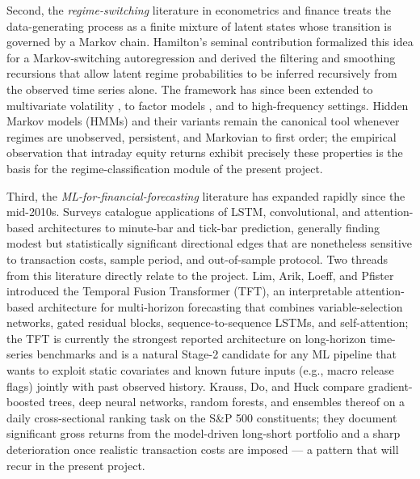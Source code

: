 \documentclass[11pt]{article}
\begin{document}
Second, the \emph{regime-switching} literature in econometrics and finance treats the data-generating process as a finite mixture of latent states whose transition is governed by a Markov chain.  Hamilton's seminal contribution \cite{hamilton1989} formalized this idea for a Markov-switching autoregression and derived the filtering and smoothing recursions that allow latent regime probabilities to be inferred recursively from the observed time series alone.  The framework has since been extended to multivariate volatility \cite{billio2010}, to factor models \cite{ang2002}, and to high-frequency settings.  Hidden Markov models (HMMs) and their variants remain the canonical tool whenever regimes are unobserved, persistent, and Markovian to first order; the empirical observation that intraday equity returns exhibit precisely these properties \cite{cartea2015} is the basis for the regime-classification module of the present project.

Third, the \emph{ML-for-financial-forecasting} literature has expanded rapidly since the mid-2010s.  Surveys \cite{sezer2020} catalogue applications of LSTM, convolutional, and attention-based architectures to minute-bar and tick-bar prediction, generally finding modest but statistically significant directional edges that are nonetheless sensitive to transaction costs, sample period, and out-of-sample protocol.  Two threads from this literature directly relate to the project.  Lim, Arik, Loeff, and Pfister \cite{lim2021} introduced the Temporal Fusion Transformer (TFT), an interpretable attention-based architecture for multi-horizon forecasting that combines variable-selection networks, gated residual blocks, sequence-to-sequence LSTMs, and self-attention; the TFT is currently the strongest reported architecture on long-horizon time-series benchmarks and is a natural Stage-2 candidate for any ML pipeline that wants to exploit static covariates and known future inputs (e.g., macro release flags) jointly with past observed history.  Krauss, Do, and Huck \cite{krauss2017} compare gradient-boosted trees, deep neural networks, random forests, and ensembles thereof on a daily cross-sectional ranking task on the S\&P 500 constituents; they document significant gross returns from the model-driven long-short portfolio and a sharp deterioration once realistic transaction costs are imposed --- a pattern that will recur in the present project.
\end{document}
